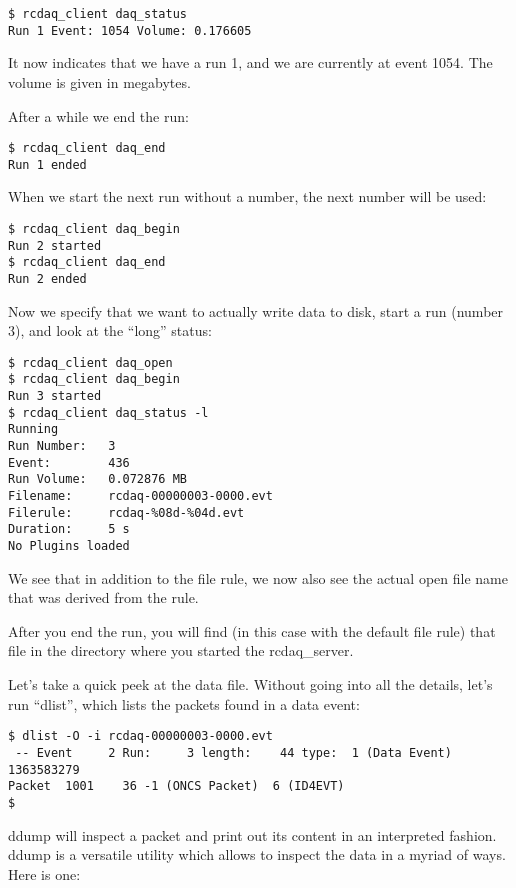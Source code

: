 \documentclass{article}[11pt]
\begin{document}
\begin{verbatim}
$ rcdaq_client daq_status 
Run 1 Event: 1054 Volume: 0.176605
\end{verbatim}

It now indicates that we have a run 1, and we are currently at event
1054. The volume is given in megabytes.

After a while we end the run:

\begin{verbatim}
$ rcdaq_client daq_end
Run 1 ended
\end{verbatim}

When we start the next run without a number, the next number will be used:

\begin{verbatim}
$ rcdaq_client daq_begin
Run 2 started
$ rcdaq_client daq_end
Run 2 ended
\end{verbatim}

Now we specify that we want to actually write data to disk, start a
run (number 3), and look at the ``long'' status:

\begin{verbatim}
$ rcdaq_client daq_open
$ rcdaq_client daq_begin
Run 3 started
$ rcdaq_client daq_status -l
Running
Run Number:   3
Event:        436
Run Volume:   0.072876 MB
Filename:     rcdaq-00000003-0000.evt
Filerule:     rcdaq-%08d-%04d.evt
Duration:     5 s
No Plugins loaded
\end{verbatim}

We see that in addition to the file rule, we now also see the actual open file name that was
derived from the rule.  

After you end the run, you will find (in this case with the default
file rule) that file in the directory where you started the
rcdaq\_server.

Let's take a quick peek at the data file. Without going into all
the details, let's run ``dlist'', which lists the packets found in a data event:

\begin{verbatim}
$ dlist -O -i rcdaq-00000003-0000.evt 
 -- Event     2 Run:     3 length:    44 type:  1 (Data Event)  1363583279
Packet  1001    36 -1 (ONCS Packet)  6 (ID4EVT)
$
\end{verbatim}

ddump will inspect a packet and print out its content in an
interpreted fashion. ddump is a versatile utility which allows to
inspect the data in a myriad of ways. Here is one:
\end{document}
